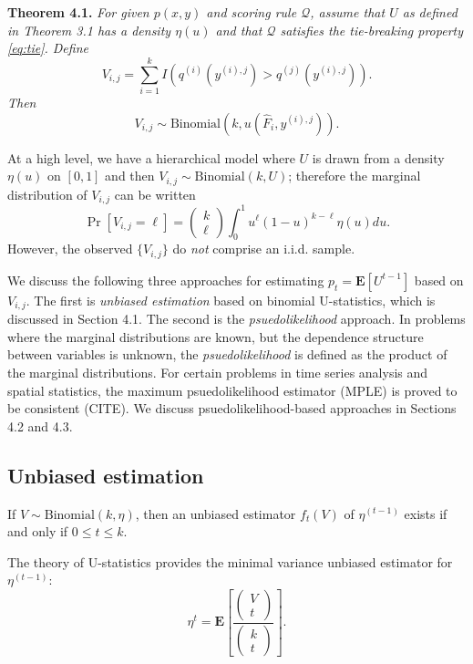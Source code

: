 \documentclass{article}
\newcommand{\E}{\textbf{E}}
\begin{document}
\noindent\textbf{Theorem 4.1.}\emph{
For given $p(x, y)$ and scoring rule $\mathcal{Q}$, assume that $U$ as defined in Theorem 3.1 has a density $\eta(u)$
and that $\mathcal{Q}$ satisfies the tie-breaking property \eqref{eq:tie}.
Define
\[
V_{i, j} = \sum_{i=1}^k I(q^{(i)}(y^{(i), j}) > q^{(j)}(y^{(i), j})).
\]
Then
\[
V_{i, j} \sim \text{Binomial}(k, u(\hat{F}_i, y^{(i), j})).
\]}

At a high level, we have a hierarchical model where $U$ is drawn from a density $\eta(u)$ on $[0, 1]$
and then $V_{i, j} \sim \text{Binomial}(k, U)$;
therefore the marginal distribution of $V_{i, j}$ can be written
\[
\Pr[V_{i,j} = \ell] = \begin{pmatrix}
k \\ \ell
\end{pmatrix}
\int_0^1 u^\ell (1-u)^{k-\ell} \eta(u) du.
\]
However, the observed $\{V_{i, j}\}$ do \emph{not} comprise an i.i.d. sample.

We discuss the following three approaches for estimating $p_t =
\E[U^{t-1}]$ based on $V_{i, j}$.  The first is \emph{unbiased
  estimation} based on binomial U-statistics, which is discussed in
Section 4.1.  The second is the \emph{psuedolikelihood} approach.  In
problems where the marginal distributions are known, but the
dependence structure between variables is unknown, the
\emph{psuedolikelihood} is defined as the product of the marginal
distributions.  For certain problems in time series analysis and
spatial statistics, the maximum psuedolikelihood estimator (MPLE) is
proved to be consistent (CITE).  We discuss psuedolikelihood-based
approaches in Sections 4.2 and 4.3.  

\subsection{Unbiased estimation}

If $V \sim \text{Binomial}(k, \eta)$, then an unbiased estimator $f_t(V)$ of $\eta^(t-1)$ exists
if and only if $0 \leq t \leq k$.

The theory of U-statistics provides the minimal variance unbiased estimator for $\eta^(t-1)$:
\[
\eta^t = \E\left[\frac{\begin{pmatrix}
V \\ t
\end{pmatrix}}{\begin{pmatrix}
k \\ t
\end{pmatrix}}\right].
\]
\end{document}
